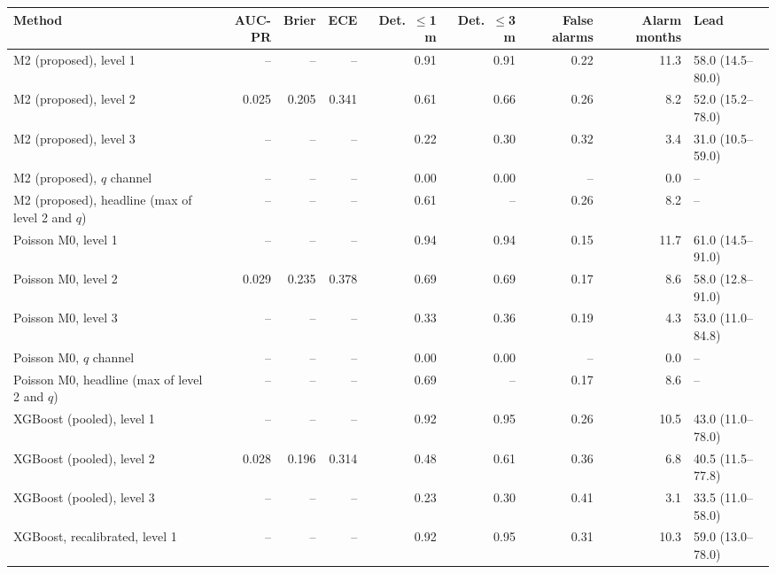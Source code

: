 \noindent\begin{minipage}{\linewidth}
\label{tab:S26_2}
\centering\tiny
\begin{tabular}{lrrrrrrrl}
\toprule
Method & AUC-PR & Brier & ECE & Det.\ $\leq$1 m & Det.\ $\leq$3 m & False alarms & Alarm months & Lead \\ \midrule
M2 (proposed), level 1 & -- & -- & -- & 0.91 & 0.91 & 0.22 & 11.3 & 58.0 (14.5--80.0) \\
M2 (proposed), level 2 & 0.025 & 0.205 & 0.341 & 0.61 & 0.66 & 0.26 & 8.2 & 52.0 (15.2--78.0) \\
M2 (proposed), level 3 & -- & -- & -- & 0.22 & 0.30 & 0.32 & 3.4 & 31.0 (10.5--59.0) \\
M2 (proposed), $q$ channel & -- & -- & -- & 0.00 & 0.00 & -- & 0.0 & -- \\
M2 (proposed), headline (max of level 2 and $q$) & -- & -- & -- & 0.61 & -- & 0.26 & 8.2 & -- \\
Poisson M0, level 1 & -- & -- & -- & 0.94 & 0.94 & 0.15 & 11.7 & 61.0 (14.5--91.0) \\
Poisson M0, level 2 & 0.029 & 0.235 & 0.378 & 0.69 & 0.69 & 0.17 & 8.6 & 58.0 (12.8--91.0) \\
Poisson M0, level 3 & -- & -- & -- & 0.33 & 0.36 & 0.19 & 4.3 & 53.0 (11.0--84.8) \\
Poisson M0, $q$ channel & -- & -- & -- & 0.00 & 0.00 & -- & 0.0 & -- \\
Poisson M0, headline (max of level 2 and $q$) & -- & -- & -- & 0.69 & -- & 0.17 & 8.6 & -- \\
XGBoost (pooled), level 1 & -- & -- & -- & 0.92 & 0.95 & 0.26 & 10.5 & 43.0 (11.0--78.0) \\
XGBoost (pooled), level 2 & 0.028 & 0.196 & 0.314 & 0.48 & 0.61 & 0.36 & 6.8 & 40.5 (11.5--77.8) \\
XGBoost (pooled), level 3 & -- & -- & -- & 0.23 & 0.30 & 0.41 & 3.1 & 33.5 (11.0--58.0) \\
XGBoost, recalibrated, level 1 & -- & -- & -- & 0.92 & 0.95 & 0.31 & 10.3 & 59.0 (13.0--78.0) \\

\end{tabular}
\end{minipage}
